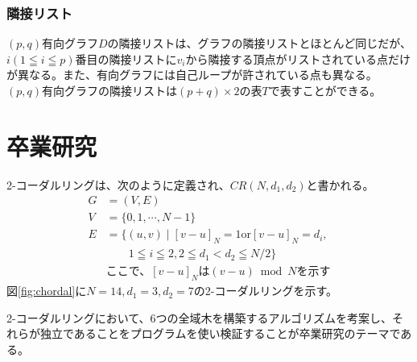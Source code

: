 \documentclass[dvipdfmx, twocolumn, 11pt]{jsarticle}
\begin{document}
        \subsubsection{隣接リスト}
            $(p, q)$有向グラフ$D$の隣接リストは、グラフの隣接リストとほとんど同じだが、$i(1 \leqq i \leqq p)$番目の隣接リストに$v_i$から隣接する頂点がリストされている点だけが異なる。また、有向グラフには自己ループが許されている点も異なる。$(p, q)$有向グラフの隣接リストは$(p + q) \times 2$の表$T$で表すことができる。
    

\section{卒業研究}
    2-コーダルリングは、次のように定義され、$CR(N, d_1, d_2)$と書かれる。
    \begin{equation*}
        \begin{split}
            G &= (V, E) \\
            V &= \{0, 1, \cdots, N-1\} \\
            E &= \{(u, v) \mid [v-u]_N = 1 \text{or} [v-u]_N = d_i, \\
              &\qquad 1 \leqq i \leqq 2, 2 \leqq d_1 < d_2 \leqq N/2\} \\
              &\text{ここで、}[v-u]_N \text{は} (v-u) \bmod N \text{を示す}
        \end{split}
    \end{equation*}
    図\ref{fig:chordal}に$N = 14, d_1 = 3, d_2 = 7$の2-コーダルリングを示す。

    2-コーダルリングにおいて、6つの全域木を構築するアルゴリズムを考案し、それらが独立であることをプログラムを使い検証することが卒業研究のテーマである。
    





\nocite{2006離散数学入門}
\nocite{chartrand1993applied}
\end{document}
